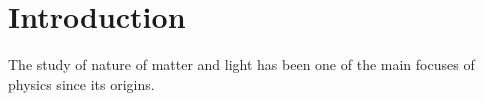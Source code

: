 \chapter{Introduction}

The study of nature of matter and light has been one of the main focuses of physics since its origins. 